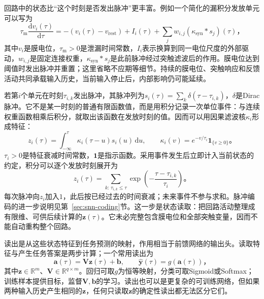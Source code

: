 回路中的状态比“这个时刻是否发出脉冲”更丰富。例如一个简化的漏积分发放单元可以写为
\begin{equation}
  \tau_{\mathrm m}\frac{\mathrm d v_i(\tau)}{\mathrm d\tau}
    =-(v_i(\tau)-v_{\mathrm{rest}})
      +I_i(\tau)+\sum_j w_{i,j}(\kappa_{\mathrm{syn}}*s_j)(\tau)\text{，}
  \label{eq:rnn-lsm-membrane}
\end{equation}
其中$v_i$是膜电位，$\tau_{\mathrm m}>0$是泄漏时间常数，$I_i$表示换算到同一电位尺度的外部驱动，$w_{i,j}$是固定连接权重，$\kappa_{\mathrm{syn}}*s_j$是此前脉冲经过突触滤波后的作用。膜电位达到阈值时发出脉冲并重置；这里省略不应期等细节。持续的膜电位、突触响应和反馈活动共同承载输入历史，当前输入停止后，内部影响仍可能延续。

若第$i$个单元在时刻$\tau_{i,k}$发出脉冲，其脉冲列为$s_i(\tau)=\sum_k\delta(\tau-\tau_{i,k})$，$\delta$是Dirac脉冲。它不是某一时刻的普通有限函数值，而是用积分记录一次单位事件：与连续权重函数相乘后积分，就取出该函数在发放时刻的值。因而可以用因果滤波核$\kappa_i$形成特征：
\begin{equation}
  z_i(\tau)=\int_{-\infty}^{\tau}\kappa_i(\tau-u)s_i(u)\,\mathrm du,
  \qquad \kappa_i(v)=e^{-v/\tau_i}\mathbf 1_{\{v\geq0\}}\text{。}
  \label{eq:rnn-lsm-filter}
\end{equation}
$\tau_i>0$是特征衰减时间常数，$\mathbf 1$是指示函数。采用事件发生后立即计入当前状态的约定，积分可以逐个发放时刻展开为
\begin{equation}
  z_i(\tau)=\sum_{k:\,\tau_{i,k}\leq\tau}
    \exp\!\left(-\frac{\tau-\tau_{i,k}}{\tau_i}\right)\text{。}
  \label{eq:rnn-lsm-event-sum}
\end{equation}
每次脉冲向$z_i$加入$1$，此后按已经过去的时间衰减；未来事件不参与求和。脉冲编码的进一步说明见第~\ref{sec:snn-coding}节。这一步是状态读取：把回路活动整理成有限维、可供后续计算的$\bm z(\tau)$。它未必完整包含膜电位和全部突触变量，因而不能自动重构整个回路。

读出是从这些状态特征到任务预测的映射，作用相当于前馈网络的输出头。读取特征与产生任务答案是两步计算；一个常用读出为
\begin{equation}
  \bm a(\tau)=\bm V\bm z(\tau)+\bm b,
  \qquad\widehat{\bm y}(\tau)=g(\bm a(\tau))\text{，}
  \label{eq:rnn-lsm-readout}
\end{equation}
其中$\bm z\in\mathbb R^m$、$\bm V\in\mathbb R^{q\times m}$。回归可取$g$为恒等映射，分类可取Sigmoid或Softmax；训练样本提供目标，监督$\bm V,\bm b$的学习。读出也可以是更复杂的可训练网络，但如果两种输入历史产生相同的$\bm z$，任何只读取$\bm z$的确定性读出都无法区分它们。

